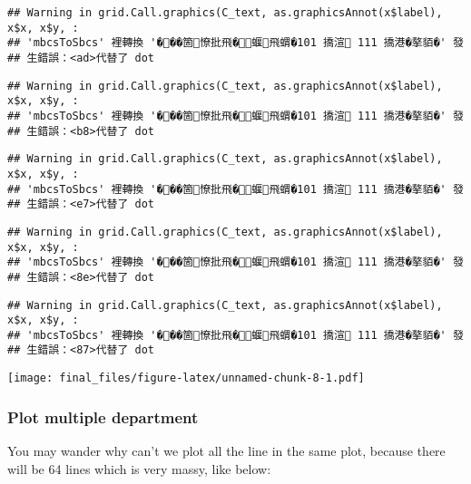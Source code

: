 \documentclass[
]{article}
\begin{document}
\begin{verbatim}
## Warning in grid.Call.graphics(C_text, as.graphicsAnnot(x$label), x$x, x$y, :
## 'mbcsToSbcs' 裡轉換 '���箇憭批飛�蝘飛蝟�101 撟渲 111 撟港�摮貊�' 發
## 生錯誤：<ad>代替了 dot
\end{verbatim}

\begin{verbatim}
## Warning in grid.Call.graphics(C_text, as.graphicsAnnot(x$label), x$x, x$y, :
## 'mbcsToSbcs' 裡轉換 '���箇憭批飛�蝘飛蝟�101 撟渲 111 撟港�摮貊�' 發
## 生錯誤：<b8>代替了 dot
\end{verbatim}

\begin{verbatim}
## Warning in grid.Call.graphics(C_text, as.graphicsAnnot(x$label), x$x, x$y, :
## 'mbcsToSbcs' 裡轉換 '���箇憭批飛�蝘飛蝟�101 撟渲 111 撟港�摮貊�' 發
## 生錯誤：<e7>代替了 dot
\end{verbatim}

\begin{verbatim}
## Warning in grid.Call.graphics(C_text, as.graphicsAnnot(x$label), x$x, x$y, :
## 'mbcsToSbcs' 裡轉換 '���箇憭批飛�蝘飛蝟�101 撟渲 111 撟港�摮貊�' 發
## 生錯誤：<8e>代替了 dot
\end{verbatim}

\begin{verbatim}
## Warning in grid.Call.graphics(C_text, as.graphicsAnnot(x$label), x$x, x$y, :
## 'mbcsToSbcs' 裡轉換 '���箇憭批飛�蝘飛蝟�101 撟渲 111 撟港�摮貊�' 發
## 生錯誤：<87>代替了 dot
\end{verbatim}

\texttt{[image: final\_files/figure-latex/unnamed-chunk-8-1.pdf]}

\hypertarget{plot-multiple-department}{%
\subsubsection{Plot multiple
department}\label{plot-multiple-department}}

You may wander why can't we plot all the line in the same plot, because
there will be 64 lines which is very massy, like below:
\end{document}
